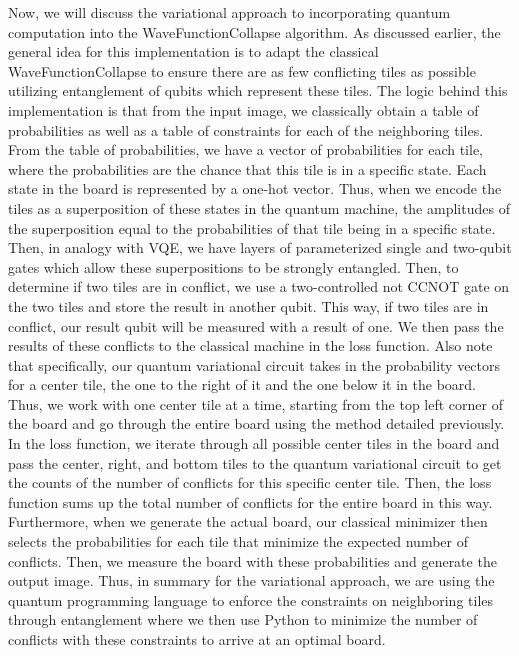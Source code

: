 \documentclass[10pt]{article}
\begin{document}
\indent Now, we will discuss the variational approach to incorporating quantum computation into the WaveFunctionCollapse algorithm. As discussed earlier, the general idea for this implementation is to adapt the classical WaveFunctionCollapse to ensure there are as few conflicting tiles as possible utilizing entanglement of qubits which represent these tiles. The logic behind this implementation is that from the input image, we classically obtain a table of probabilities as well as a table of constraints for each of the neighboring tiles. From the table of probabilities, we have a vector of probabilities for each tile, where the probabilities are the chance that this tile is in a specific state. Each state in the board is represented by a one-hot vector. Thus, when we encode the tiles as a superposition of these states in the quantum machine, the amplitudes of the superposition equal to the probabilities of that tile being in a specific state. Then, in analogy with VQE, we have layers of parameterized single and two-qubit gates which allow these superpositions to be strongly entangled. Then, to determine if two tiles are in conflict, we use a two-controlled not CCNOT gate on the two tiles and store the result in another qubit. This way, if two tiles are in conflict, our result qubit will be measured with a result of one. We then pass the results of these conflicts to the classical machine in the loss function. Also note that specifically, our quantum variational circuit takes in the probability vectors for a center tile, the one to the right of it and the one below it in the board. Thus, we work with one center tile at a time, starting from the top left corner of the board and go through the entire board using the method detailed previously.\\
\indent In the loss function, we iterate through all possible center tiles in the board and pass the center, right, and bottom tiles to the quantum variational circuit to get the counts of the number of conflicts for this specific center tile. Then, the loss function sums up the total number of conflicts for the entire board in this way. Furthermore, when we generate the actual board, our classical minimizer then selects the probabilities for each tile that minimize the expected number of conflicts. Then, we measure the board with these probabilities and generate the output image. Thus, in summary for the variational approach, we are using the quantum programming language to enforce the constraints on neighboring tiles through entanglement where we then use Python to minimize the number of conflicts with these constraints to arrive at an optimal board.\\
\end{document}
